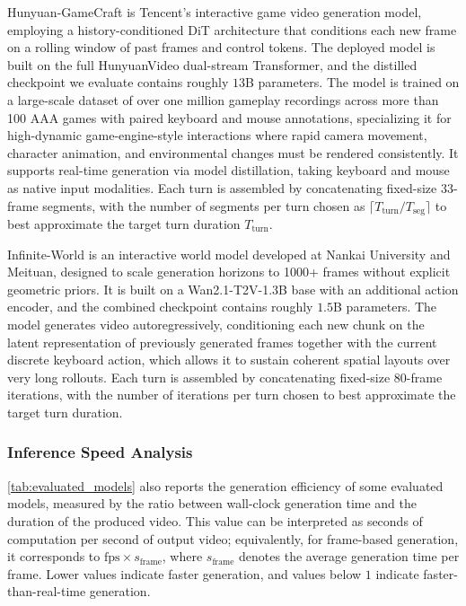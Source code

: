 Hunyuan-GameCraft is Tencent's interactive game video generation model, employing a history-conditioned DiT architecture that conditions each new frame on a rolling window of past frames and control tokens.
The deployed model is built on the full HunyuanVideo dual-stream Transformer, and the distilled checkpoint we evaluate contains roughly $13$B parameters.
The model is trained on a large-scale dataset of over one million gameplay recordings across more than 100 AAA games with paired keyboard and mouse annotations, specializing it for high-dynamic game-engine-style interactions where rapid camera movement, character animation, and environmental changes must be rendered consistently.
It supports real-time generation via model distillation, taking keyboard and mouse as native input modalities.
Each turn is assembled by concatenating fixed-size $33$-frame segments, with the number of segments per turn chosen as $\lceil T_{\text{turn}} / T_{\text{seg}} \rceil$ to best approximate the target turn duration $T_{\text{turn}}$.

Infinite-World is an interactive world model developed at Nankai University and Meituan, designed to scale generation horizons to 1000+ frames without explicit geometric priors.
It is built on a Wan2.1-T2V-1.3B base with an additional action encoder, and the combined checkpoint contains roughly $1.5$B parameters.
The model generates video autoregressively, conditioning each new chunk on the latent representation of previously generated frames together with the current discrete keyboard action, which allows it to sustain coherent spatial layouts over very long rollouts.
Each turn is assembled by concatenating fixed-size $80$-frame iterations, with the number of iterations per turn chosen to best approximate the target turn duration.


\subsubsection{Inference Speed Analysis}

\cref{tab:evaluated_models} also reports the generation efficiency of some evaluated models, measured by the ratio between wall-clock generation time and the duration of the produced video. This value can be interpreted as seconds of computation per second of output video; equivalently, for frame-based generation, it corresponds to $\mathrm{fps}\times s_{\text{frame}}$, where $s_{\text{frame}}$ denotes the average generation time per frame. Lower values indicate faster generation, and values below $1$ indicate faster-than-real-time generation.

